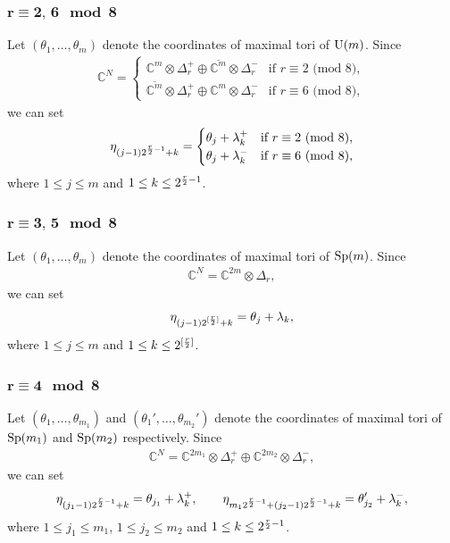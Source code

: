 \documentclass[10pt,a4paper]{amsart}
\numberwithin{equation}{section}
\begin{document}
\subsubsection[$r\equiv 2,\,6 \mod 8$]{$\boldsymbol{r\equiv 2,\,6 \mod 8}$}
Let $(\theta_1,\dots,\theta_m)$ denote the coordinates of maximal tori of ${\rm U}(m)$. Since
\begin{gather*}\mathbb{C}^N=
\begin{cases}
\mathbb{C}^{m}\otimes \Delta_r^+\oplus \overline{\mathbb{C}^{m}}\otimes \Delta_r^- & \text{if $r\equiv 2$ (mod 8)},\\
\overline{\mathbb{C}^{m}}\otimes \Delta_r^+\oplus \mathbb{C}^{m}\otimes \Delta_r^- & \text{if $r\equiv 6$ (mod 8)},
\end{cases}\end{gather*}
we can set
\begin{gather}
 \eta_{(j-1)2^{{r\over 2}-1}+k}=
 \begin{cases}
 \theta_j + \lambda_k^+ & \text{if $r\equiv 2$ (mod 8)},\\
 \theta_j + \lambda_k^- & \text{if $r\equiv 6$ (mod 8)},
 \end{cases}\label{eq: pesos r=2,6}
\end{gather}
where $1\leq j\leq m$ and $1\leq k \leq 2^{{r\over 2}-1}$.

\subsubsection[$r\equiv 3,\,5 \mod 8$]{$\boldsymbol{r\equiv 3,\,5 \mod 8}$}
Let $(\theta_1,\dots,\theta_m)$ denote the coordinates of maximal tori of ${\rm Sp}(m)$. Since
\begin{gather*}\mathbb{C}^N=\mathbb{C}^{2m}\otimes \Delta_r,\end{gather*}
we can set
\begin{gather}
 \eta_{(j-1)2^{[{r\over 2}]}+k}= \theta_j + \lambda_k , \label{eq: pesos r=3,5}
\end{gather}
where $1\leq j\leq m$ and $1\leq k \leq 2^{[{r\over 2}]}$.

\subsubsection[$r\equiv 4 \mod 8$]{$\boldsymbol{r\equiv 4 \mod 8}$}
Let $(\theta_1,\dots,\theta_{m_1})$ and $(\theta_1',\dots,\theta_{m_2}')$ denote the coordinates of maximal tori of ${\rm Sp}(m_1)$ and ${\rm Sp}(m_2)$ respectively. Since
\begin{gather*}\mathbb{C}^N=\mathbb{C}^{2m_1}\otimes \Delta_r^+\oplus\mathbb{C}^{2m_2}\otimes \Delta_r^-,\end{gather*}
we can set
\begin{gather}
 \eta_{(j_1-1)2^{{r\over 2}-1}+k}= \theta_{j_1} + \lambda_k^+, \qquad
 \eta_{m_12^{{r\over 2}-1}+(j_2-1)2^{{r\over 2}-1}+k}= \theta_{j_2}' + \lambda_k^- , \label{eq: pesos r=4}
\end{gather}
where $1\leq j_1\leq m_1$, $1\leq j_2\leq m_2$ and $1\leq k \leq 2^{{r\over 2}-1}$.
\end{document}
